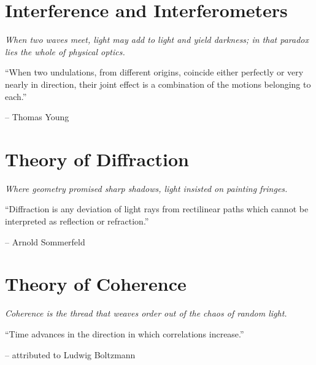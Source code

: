 \documentclass[spanish,11pt,twoside,openright]{book}
\begin{document}
	

	\chapter{Interference and Interferometers}
	\thispagestyle{empty}
	\vspace*{2cm}
	\begin{center}
		{\itshape\Huge When two waves meet, light may add to light and yield darkness; in that paradox lies the whole of physical optics. \par}
		\vspace{1cm}
		\epigraph{``When two undulations, from different origins, coincide either perfectly or very nearly in direction, their joint effect is a combination of the motions belonging to each.''}{-- Thomas Young}
	\end{center}
	\clearpage

	

	\chapter{Theory of Diffraction}
	\thispagestyle{empty}
	\vspace*{2cm}
	\begin{center}
		{\itshape\Huge Where geometry promised sharp shadows, light insisted on painting fringes. \par}
		\vspace{1cm}
		\epigraph{``Diffraction is any deviation of light rays from rectilinear paths which cannot be interpreted as reflection or refraction.''}{-- Arnold Sommerfeld}
	\end{center}
	\clearpage

	

	\chapter{Theory of Coherence}\label{chap:Coherence}
	\thispagestyle{empty}
	\vspace*{2cm}
	\begin{center}
		{\itshape\Huge Coherence is the thread that weaves order out of the chaos of random light. \par}
		\vspace{1cm}
		\epigraph{``Time advances in the direction in which correlations increase.''}{-- attributed to Ludwig Boltzmann}
	\end{center}
	\clearpage

	

    
	
	
\end{document}
